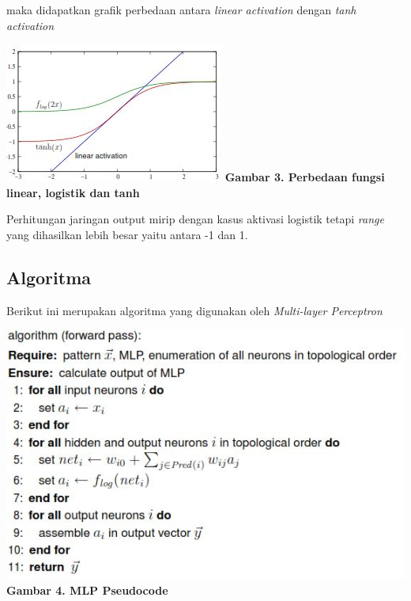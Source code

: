 	maka didapatkan grafik perbedaan antara \textit{linear activation} dengan \textit{tanh activation}
	\begin{center}
		\includegraphics{graphic-2.jpg}
		\newline \textbf{Gambar 3. Perbedaan fungsi linear, logistik dan tanh}
	\end{center}
	Perhitungan jaringan output mirip dengan kasus aktivasi logistik tetapi \textit{range} yang dihasilkan lebih besar yaitu antara -1 dan 1.

	\subsection{Algoritma}
	Berikut ini merupakan algoritma yang digunakan oleh \textit{Multi-layer Perceptron}
	\begin{center}
		\includegraphics{images-2.jpg}
		\newline \textbf{Gambar 4. MLP Pseudocode}
	\end{center}

